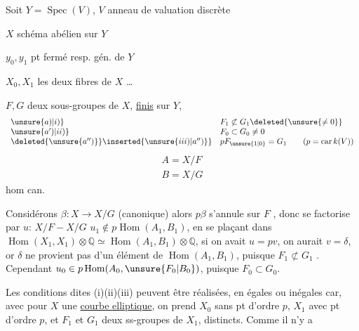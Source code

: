 Soit $Y=\operatorname{Spec}(V)$, $V$ anneau de valuation discrète

$X$ schéma abélien sur $Y$

$y_0,y_1$ pt fermé resp. gén. de $Y$

$X_0,X_1$ les deux fibres de $X$ \ldots

$F,G$ deux sous-groupes de $X$, \uline{finis} sur $Y$,
\[
\begin{array}{ll}
\unsure{a)|i)}&F_1\not\subset G_1\deleted{\unsure{\ne 0}}\\
\unsure{a')|ii)}&F_0\subset G_0\ne 0\\
\deleted{\unsure{a'')}}\inserted{\unsure{iii)|a'')}}&pF_{\unsure{1|0}}=G_1\qquad(p=\operatorname{car}k(V))
\end{array}
\]
\[
\begin{array}{l}A=X/F\\B=X/G\end{array}
\]
hom can.

Considérons $\beta:X\longrightarrow X/G$ (canonique) alors $p\beta$ s'annule sur  $F$ , donc se factorise par \uline{$u$}: $X/F-X/G$
 $u_1\notin p\operatorname{Hom}(A_1,B_1)$, en  se plaçant dans $\operatorname{Hom}(X_1,X_1)\otimes\mathbb Q\simeq\operatorname{Hom}(A_1,B_1)\otimes\mathbb Q$, si on avait $u=pv$, on aurait $v=\delta$, or $\delta$ ne provient pas d'un élément de $\operatorname{Hom}(A_1,B_1)$, puisque $F_1\not\subset G_1$ \deleted{[\unsure{sinon}, par (i), on aurait $F_1=0$ d'où $F_0=0$ qui contredit (ii)]}. Cependant $u_0\in p\operatorname{Hom}(A_0,\unsure{F_0|B_0})$, puisque $F_0\subset G_0$.

Les conditions dites (i)(ii)(iii) peuvent être réalisées, en égales ou inégales car, avec pour $X$ une \uline{courbe elliptique}, on prend $X_0$ sans pt d'ordre $p$, $X_1$ avec pt d'ordre $p$, et $F_1$ et $G_1$ deux ss-groupes de $X_1$,  distincts. Comme il n'y a


